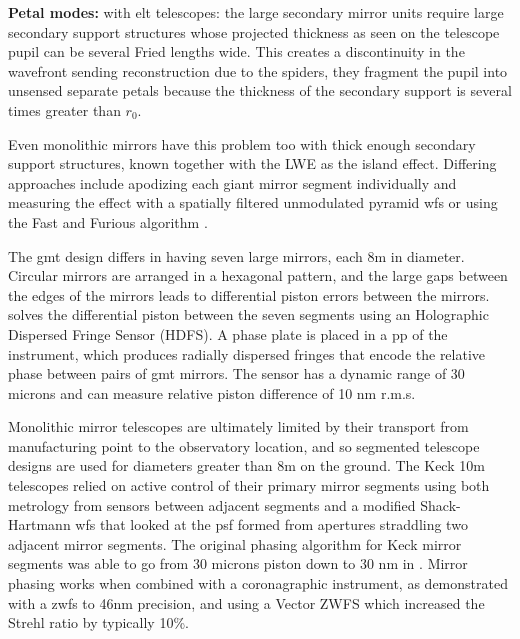 \documentclass[letterpaper]{ar-1col}
\begin{document}
{\bf Petal modes: } with \ac{elt} telescopes: the large secondary mirror units require large secondary support structures whose projected thickness as seen on the telescope pupil can be several Fried lengths wide.
%
This creates a discontinuity in the wavefront sending reconstruction due to the spiders, they fragment the pupil into unsensed separate petals because the thickness of the secondary support is several times greater than $r_0$.

Even monolithic mirrors have this problem too with thick enough secondary support structures, known together with the LWE as the island effect.
%
Differing approaches include apodizing each giant mirror segment individually \citep[Redundant Apodized Pupils; RAP ][]{Leboulleux22,Leboulleux22a} and  measuring the effect with a spatially filtered unmodulated pyramid \ac{wfs} \citep{Levraud24} or using the Fast and Furious algorithm  \citep[ demonstrated on Subaru/SCExAO in][]{Bos20}.

The \ac{gmt} design differs in having seven large mirrors, each 8m in diameter.
%
Circular mirrors are arranged in a hexagonal pattern, and the large gaps between the edges of the mirrors leads to differential piston errors between the mirrors.
%
\citet{Haffert22,Quiros-Pacheco22} solves the differential piston between the seven segments using an Holographic Dispersed Fringe Sensor (HDFS).
%
A phase plate is placed in a \ac{pp} of the instrument, which produces radially dispersed fringes that encode the relative phase between pairs of \ac{gmt} mirrors.
%
The sensor has a dynamic range of 30 microns and can measure relative piston difference of 10 nm r.m.s.

 
Monolithic mirror telescopes are ultimately limited by their transport from manufacturing point to the observatory location, and so segmented telescope designs are used for diameters greater than 8m on the ground.
The Keck 10m telescopes relied on active control of their primary mirror segments using both metrology from sensors between adjacent segments and a modified Shack-Hartmann \ac{wfs} that looked at the \ac{psf} formed from apertures straddling two adjacent mirror segments.
%
The original phasing algorithm for Keck mirror segments was able to go from 30 microns piston down to 30 nm in \citet{Chanan98,Chanan00}.
%
Mirror phasing works when combined with a coronagraphic instrument, as \citep{vanKooten22} demonstrated with a \ac{zwfs} to 46nm precision, and \citep{Salama24} using a Vector ZWFS which increased the Strehl ratio by typically 10\%.
\end{document}
